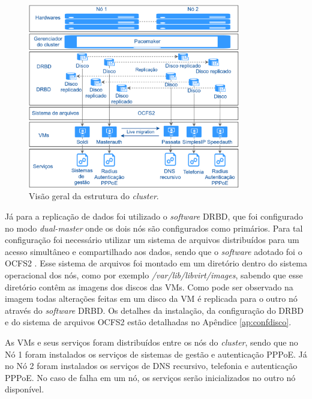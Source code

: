 \begin{figure}[h!]
 \centering
 \includegraphics[width=350px]{img/projeto_estrutura.eps}
 \caption{Visão geral da estrutura do \textit{cluster}.}
 \label{fig:projeto_estrutura}
\end{figure}

Já para a replicação de dados foi utilizado o \textit{software} \ac{DRBD}, que foi configurado no modo \textit{dual-master} onde os dois nós 
são configurados como primários. Para tal configuração foi necessário utilizar um sistema de arquivos distribuídos para um acesso 
simultâneo e compartilhado aos dados, sendo que o \textit{software} adotado foi o \ac{OCFS2} \cite{ocfs2}. 
Esse sistema de arquivos foi montado em um diretório dentro do sistema operacional dos nós, como por exemplo 
\textit{/var/lib/libvirt/images}, sabendo que esse diretório contêm as imagens dos discos das \acp{VM}. Como pode ser observado na imagem
todas alterações feitas em um disco da \ac{VM} é replicada para o outro nó através do \textit{software} \ac{DRBD}.
Os detalhes da instalação, da configuração do \ac{DRBD} e do sistema de arquivos \ac{OCFS2} estão detalhadas no Apêndice \ref{ap:confdisco}. 

As \acp{VM} e seus serviços foram distribuídos entre os nós do \textit{cluster}, sendo que no Nó 1 foram instalados os serviços de sistemas 
de gestão e autenticação \ac{PPPoE}. Já no Nó 2 foram instalados os serviços de \ac{DNS} recursivo, telefonia e autenticação \ac{PPPoE}.
No caso de falha em um nó, os serviços serão inicializados no outro nó disponível. 



